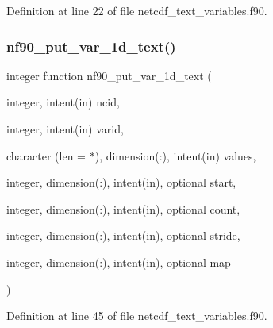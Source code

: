 Definition at line 22 of file netcdf\+\_\+text\+\_\+variables.\+f90.

\mbox{\label{netcdf__text__variables_8f90_ad41d9ea76e7347555a238de5afd425e8}} 
\subsubsection{\texorpdfstring{nf90\+\_\+put\+\_\+var\+\_\+1d\+\_\+text()}{nf90\_put\_var\_1d\_text()}}
{\footnotesize\ttfamily integer function nf90\+\_\+put\+\_\+var\+\_\+1d\+\_\+text (\begin{DoxyParamCaption}\item[{integer, intent(in)}]{ncid,  }\item[{integer, intent(in)}]{varid,  }\item[{character (len = $\ast$), dimension(\+:), intent(in)}]{values,  }\item[{integer, dimension(\+:), intent(in), optional}]{start,  }\item[{integer, dimension(\+:), intent(in), optional}]{count,  }\item[{integer, dimension(\+:), intent(in), optional}]{stride,  }\item[{integer, dimension(\+:), intent(in), optional}]{map }\end{DoxyParamCaption})}



Definition at line 45 of file netcdf\+\_\+text\+\_\+variables.\+f90.

\mbox{\label{netcdf__text__variables_8f90_abeb77c7100cff6d00ee5eb0912a8696c}} 
